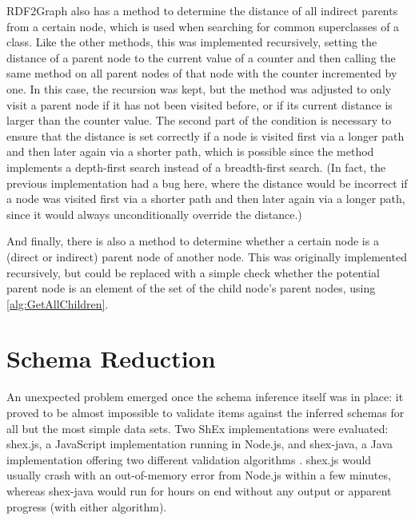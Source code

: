 RDF2Graph also has a method to determine the distance of all indirect parents from a certain node,
which is used when searching for common superclasses of a class.
Like the other methods, this was implemented recursively,
setting the distance of a parent node to the current value of a counter
and then calling the same method on all parent nodes of that node with the counter incremented by one.
In this case, the recursion was kept,
but the method was adjusted to only visit a parent node
if it has not been visited before, or if its current distance is larger than the counter value.
The second part of the condition is necessary to ensure that the distance is set correctly
if a node is visited first via a longer path and then later again via a shorter path,
which is possible since the method implements a depth-first search instead of a breadth-first search.
(In fact, the previous implementation had a bug here,
where the distance would be incorrect if a node was visited first via a shorter path and then later again via a longer path,
since it would always unconditionally override the distance.)

And finally, there is also a method to determine whether a certain node is a (direct or indirect) parent node of another node.
This was originally implemented recursively,
but could be replaced with a simple check whether the potential parent node is an element of the set of the child node’s parent nodes,
using \cref{alg:GetAllChildren}.

\section{Schema Reduction}
\label{sec:RDF2Graph+Wikidata:schema-reduction}

An unexpected problem emerged once the schema inference itself was in place: %
it proved to be almost impossible to validate items against the inferred schemas
for all but the most simple data sets.
Two ShEx implementations were evaluated:
shex.js, %
a JavaScript implementation running in Node.js,
and shex-java,
a Java implementation offering two different validation algorithms \cite{boneva:hal-01590350}.
shex.js would usually crash with an out-of-memory error from Node.js within a few minutes,
whereas shex-java would run for hours on end without any output or apparent progress
(with either algorithm).

